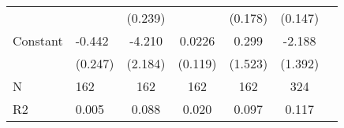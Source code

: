 {\begin{tabularx}{0.8\textwidth}{Xl*{5}{c}}
                    &                     &     (0.239)         &                     &     (0.178)         &     (0.147)         \\
[0.5em]
Constant            &      -0.442\sym{*}  &      -4.210\sym{*}  &      0.0226         &       0.299         &      -2.188         \\
                    &     (0.247)         &     (2.184)         &     (0.119)         &     (1.523)         &     (1.392)         \\
\hline
N                   &         162         &         162         &         162         &         162         &         324         \\
R2                  &       0.005         &       0.088         &       0.020         &       0.097         &       0.117         \\
\hline\hline
\end{tabularx}
}
